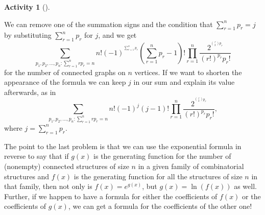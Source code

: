 \documentclass[10pt,]{book}
\theoremstyle{plain}
\theoremstyle{definition}
\newtheorem{activity}[project]{Activity}
\numberwithin{equation}{chapter}
\begin{document}
\begin{activity}[]
\begin{enumerate}[label=(\alph*)]
%
\par
We can remove one of the summation signs and the condition that \(\sum_{r=1}^n p_r=j\) by substituting \(\sum_{r=1}^n p_r\) for \(j\), and we get%
\begin{equation*}
\sum_{{p_1,p_2,\ldots,p_n: \sum_{r=1}^n
rp_r =n }}{n!}(-1)^{^{\sum_{r=1}^n p_r}}\left(\sum_{r=1}^n p_r -1\right)!
\prod_{r=1}^n\frac{2^{^{\binom{r}{2}p_r}}
}{(r!)^{p_r}p_r!}
\end{equation*}
for the number of connected graphs on \(n\) vertices. If we want to shorten the appearance of the formula we can keep \(j\) in our sum and explain its value afterwards, as in%
\begin{equation*}
\sum_{{p_1,p_2,\ldots,p_n: \sum_{r=1}^n
rp_r =n }}{n!}(-1)^j(j-1)!
\prod_{r=1}^n \frac{2^{^{\binom{r}{2}p_r}}
}{(r!)^{p_r}p_r!},
\end{equation*}
where \(j=\sum_{r=1}^n p_r\).%

\end{enumerate}
\end{activity}
The point to the last problem is that we can use the exponential formula in reverse to say that if \(g(x)\) is the generating function for the number of (nonempty) connected structures of size \(n\) in a given family of combinatorial structures and \(f(x)\) is the generating function for all the structures of size \(n\) in that family, then not only is \(f(x) =
e^{g(x)}\), but \(g(x) = \ln(f(x))\) as well. Further, if we happen to have a formula for either the coefficients of \(f(x)\) or the coefficients of \(g(x)\), we can get a formula for the coefficients of the other one!%
\typeout{************************************************}
\typeout{************************************************}
\end{document}
